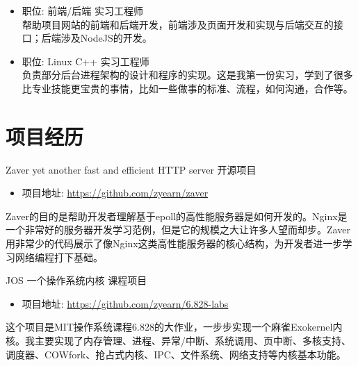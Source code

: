 \documentclass[11pt,a4paper]{moderncv}
\begin{document}
{
\begin{itemize}
\item 职位: 前端/后端 实习工程师\\
帮助项目网站的前端和后端开发，前端涉及页面开发和实现与后端交互的接口；后端涉及NodeJS的开发。
\end{itemize}
}

{
\begin{itemize}
\item 职位: Linux C++ 实习工程师\\
负责部分后台进程架构的设计和程序的实现。这是我第一份实习，学到了很多比专业技能更宝贵的事情，比如一些做事的标准、流程，如何沟通，合作等。
\end{itemize}
}


\section{项目经历}
{Zaver}
{yet another fast and efficient HTTP server}
{开源项目}
{}
{
\begin{itemize}
    \item 项目地址: \url{https://github.com/zyearn/zaver}
\end{itemize}
Zaver的目的是帮助开发者理解基于epoll的高性能服务器是如何开发的。Nginx是一个非常好的服务器开发学习范例，但是它的规模之大让许多人望而却步。Zaver用非常少的代码展示了像Nginx这类高性能服务器的核心结构，为开发者进一步学习网络编程打下基础。
}
\vspace*{0.2\baselineskip}

{JOS}
{一个操作系统内核}
{课程项目}
{}
{
\begin{itemize}
    \item 项目地址: \url{https://github.com/zyearn/6.828-labs}
\end{itemize}
这个项目是MIT操作系统课程6.828的大作业，一步步实现一个麻雀Exokernel内核。我主要实现了内存管理、进程、异常/中断、系统调用、页中断、多核支持、调度器、COWfork、抢占式内核、IPC、文件系统、网络支持等内核基本功能。
}
\vspace*{0.2\baselineskip}
\end{document}
